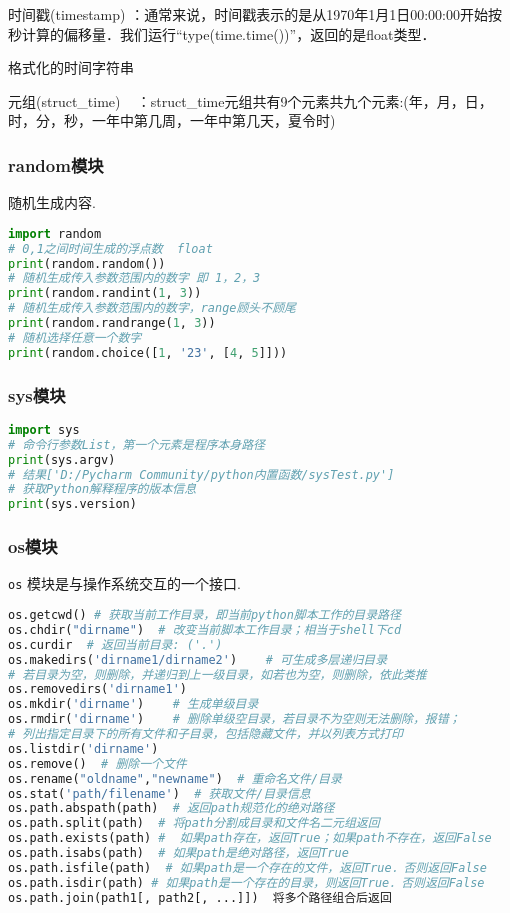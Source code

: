 时间戳(timestamp) ：通常来说，时间戳表示的是从1970年1月1日00:00:00开始按秒计算的偏移量．我们运行“type(time.time())”，返回的是float类型．

格式化的时间字符串

元组(struct_time)   ：struct_time元组共有9个元素共九个元素:(年，月，日，时，分，秒，一年中第几周，一年中第几天，夏令时)

\subsubsection{random模块}
随机生成内容.
\begin{lstlisting}[language=python]
import random
# 0,1之间时间生成的浮点数  float
print(random.random())
# 随机生成传入参数范围内的数字 即 1，2，3
print(random.randint(1, 3))
# 随机生成传入参数范围内的数字，range顾头不顾尾
print(random.randrange(1, 3))
# 随机选择任意一个数字
print(random.choice([1, '23', [4, 5]]))
\end{lstlisting}

\subsubsection{sys模块}
\begin{lstlisting}[language=python]
import sys
# 命令行参数List，第一个元素是程序本身路径
print(sys.argv)
# 结果['D:/Pycharm Community/python内置函数/sysTest.py']
# 获取Python解释程序的版本信息
print(sys.version)
\end{lstlisting}

\subsubsection{os模块}
\verb|os| 模块是与操作系统交互的一个接口.
\begin{lstlisting}[language=python]
os.getcwd() # 获取当前工作目录，即当前python脚本工作的目录路径
os.chdir("dirname")  # 改变当前脚本工作目录；相当于shell下cd
os.curdir  # 返回当前目录: ('.')
os.makedirs('dirname1/dirname2')    # 可生成多层递归目录
# 若目录为空，则删除，并递归到上一级目录，如若也为空，则删除，依此类推
os.removedirs('dirname1')
os.mkdir('dirname')    # 生成单级目录
os.rmdir('dirname')    # 删除单级空目录，若目录不为空则无法删除，报错；
# 列出指定目录下的所有文件和子目录，包括隐藏文件，并以列表方式打印
os.listdir('dirname')
os.remove()  # 删除一个文件
os.rename("oldname","newname")  # 重命名文件/目录
os.stat('path/filename')  # 获取文件/目录信息
os.path.abspath(path)  # 返回path规范化的绝对路径
os.path.split(path)  # 将path分割成目录和文件名二元组返回
os.path.exists(path) #  如果path存在，返回True；如果path不存在，返回False
os.path.isabs(path)  # 如果path是绝对路径，返回True
os.path.isfile(path)  # 如果path是一个存在的文件，返回True．否则返回False
os.path.isdir(path) # 如果path是一个存在的目录，则返回True．否则返回False
os.path.join(path1[, path2[, ...]])  将多个路径组合后返回
\end{lstlisting}
